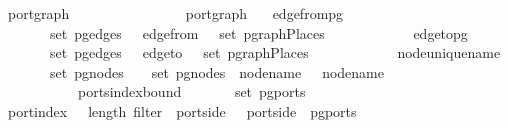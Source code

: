 \isamarkupfalse%
\ port{\isacharunderscore}graph\ {\isacharequal}\isanewline
\ \ \ \ \ \ \ \ \ \ {\isacharcolon}{\isacharcolon}\ {\isachardoublequoteopen}{\isacharparenleft}\ \ \ \ port{\isacharunderscore}graph{\isachardoublequoteclose}\isanewline
\ \ \ edge{\isacharunderscore}from{\isacharunderscore}pg{\isacharcolon}\isanewline
\ \ \ \ {\isachardoublequoteopen}{\isasymAnd}\ \ {\isasymin}\ set\ {\isacharparenleft}pg{\isacharunderscore}edges\ \ {\isasymLongrightarrow}\ edge{\isacharunderscore}from\ \ {\isasymin}\ set\ {\isacharparenleft}pgraphPlaces\ \isanewline
\ \ \ \ \ \ \ \ \ \ \ edge{\isacharunderscore}to{\isacharunderscore}pg{\isacharcolon}\isanewline
\ \ \ \ {\isachardoublequoteopen}{\isasymAnd}\ \ {\isasymin}\ set\ {\isacharparenleft}pg{\isacharunderscore}edges\ \ {\isasymLongrightarrow}\ edge{\isacharunderscore}to\ \ {\isasymin}\ set\ {\isacharparenleft}pgraphPlaces\ \isanewline
\ \ \ \ \ \ \ \ \ \ \ node{\isacharunderscore}unique{\isacharunderscore}name{\isacharcolon}\isanewline
\ \ \ \ {\isachardoublequoteopen}{\isasymAnd}\ {\isasymlbrakk}\ {\isasymin}\ set\ {\isacharparenleft}pg{\isacharunderscore}nodes\ \ \ {\isasymin}\ set\ {\isacharparenleft}pg{\isacharunderscore}nodes\ \ node{\isacharunderscore}name\ \ {\isacharequal}\ node{\isacharunderscore}name\ \isanewline
{}\ \ {\isacharequal}\ \isanewline
\ \ \ \ \ \ \ \ \ \ \ ports{\isacharunderscore}index{\isacharunderscore}bound{\isacharcolon}\isanewline
\ \ \ \ {\isachardoublequoteopen}{\isasymAnd}\ \ {\isasymin}\ set\ {\isacharparenleft}pg{\isacharunderscore}ports\ \isanewline
{}\ port{\isachardot}index\ \ {\isacharless}\ length\ {\isacharparenleft}filter\ {\isacharparenleft}{\isasymlambda}\ port{\isachardot}side\ \ {\isacharequal}\ port{\isachardot}side\ \ {\isacharparenleft}pg{\isacharunderscore}ports\ \isanewline
